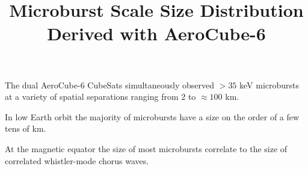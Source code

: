 \documentclass[draft]{agujournal2019}
\begin{document}
\title{Microburst Scale Size Distribution Derived with AeroCube-6}

%
%





\begin{keypoints}
\item The dual AeroCube-6 CubeSats simultaneously observed $> 35$ keV microbursts at a variety of spatial separations ranging from $2$ to $\approx 100$ km.
\item In low Earth orbit the majority of microbursts have a size on the order of a few tens of km.
\item At the magnetic equator the size of most microbursts correlate to the size of correlated whistler-mode chorus waves.
\end{keypoints}

%
%

\end{document}
